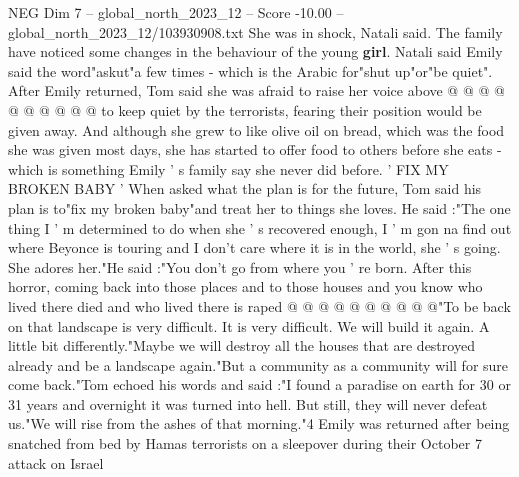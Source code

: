 \begin{textsample}{NEG Dim 7 – global\_north\_2023\_12 – Score -10.00 – global\_north\_2023\_12/103930908.txt}
She was in shock, Natali said.
The family have noticed some changes in the behaviour of the young \textbf{girl}.
Natali said Emily said the word"askut"a few times - which is the Arabic for"shut up"or"be quiet".
After Emily returned, Tom said she was afraid to raise her voice above @ @ @ @ @ @ @ @ @ @ to keep quiet by the terrorists, fearing their position would be given away.
And although she grew to like olive oil on bread, which was the food she was given most days, she has started to offer food to others before she eats - which is something Emily ' s family say she never did before. ' FIX MY BROKEN BABY ' When asked what the plan is for the future, Tom said his plan is to"fix my broken baby"and treat her to things she loves.
He said :"The one thing I ' m determined to do when she ' s recovered enough, I ' m gon na find out where Beyonce is touring and I don't care where it is in the world, she ' s going.
She adores her."He said :"You don't go from where you ' re born.
After this horror, coming back into those places and to those houses and you know who lived there died and who lived there is raped @ @ @ @ @ @ @ @ @ @"To be back on that landscape is very difficult.
It is very difficult.
We will build it again.
A little bit differently."Maybe we will destroy all the houses that are destroyed already and be a landscape again."But a community as a community will for sure come back."Tom echoed his words and said :"I found a paradise on earth for 30 or 31 years and overnight it was turned into hell.
But still, they will never defeat us."We will rise from the ashes of that morning."4 Emily was returned after being snatched from bed by Hamas terrorists on a sleepover during their October 7 attack on Israel

\end{textsample}

